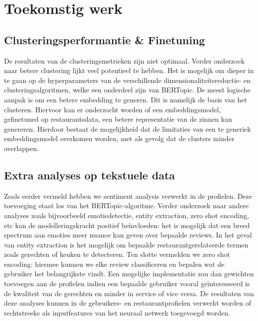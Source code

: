 \section{Toekomstig werk}
\subsection*{Clusteringsperformantie \& Finetuning}
De resultaten van de clusteringsmetrieken zijn niet optimaal. Verder onderzoek naar betere clustering lijkt veel potentieel te hebben. Het is mogelijk om dieper in te gaan op de hyperparameters van de verschillende dimensionaliteitsreductie- en clusteringsalgoritmen, welke een onderdeel zijn van BERTopic. De meest logische aanpak is om een betere embedding te generen. Dit is namelijk de basis van het clusteren. Hiervoor kan er onderzocht worden of een embeddingsmodel, gefinetuned op restaurantsdata, een betere representatie van de zinnen kan genereren. Hierdoor bestaat de mogelijkheid dat de limitaties van een te generiek embeddingsmodel overkomen worden, met als gevolg dat de clusters minder overlappen.

\subsection*{Extra analyses op tekstuele data}
Zoals eerder vermeld hebben we sentiment analysis verwerkt in de profielen. Deze toevoeging staat los van het BERTopic-algoritme. Verder onderzoek naar andere analyses zoals bijvoorbeeld emotiedetectie, entity extraction, zero shot encoding, etc kan de modelleringskracht positief beïnvloeden: het is mogelijk dat een breed spectrum aan emoties meer nuance kan geven over bepaalde reviews. In het geval van entity extraction is het mogelijk om bepaalde restaurantgerelateerde termen zoals gerechten of keuken te detecteren. Ten slotte vermelden we zero shot encoding: hiermee kunnen we elke review classificeren en bepalen wat de gebruiker het belangrijkste vindt. Een mogelijke implementatie zou dan gewichten toevoegen aan de profielen indien een bepaalde gebruiker vooral geïnteresseerd is de kwaliteit van de gerechten en minder in service of vice versa.\newline
De resultaten van deze analyses kunnen in de gebruikers- en restaurantprofielen verwerkt worden of rechtstreeks als inputfeatures van het neuraal netwerk toegevoegd worden.

